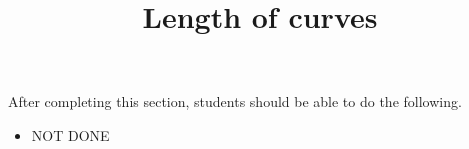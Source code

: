\documentclass{ximera}
\title{Length of curves}
\begin{document}
\begin{abstract}
\end{abstract}

\maketitle

\begin{sectionOutcomes}

After completing this section, students should be able to do the following.

\begin{itemize}
\item NOT DONE
\end{itemize}

\end{sectionOutcomes}
\end{document}
